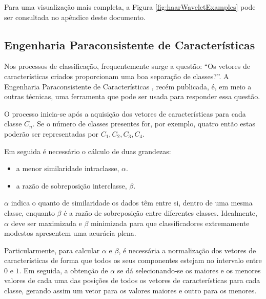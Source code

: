 			
			
			\par Para uma visualização mais completa, a Figura \ref{fig:haarWaveletExamples} pode ser consultada no apêndice deste documento.
			
			\subsection{Engenharia Paraconsistente de Características}
				\par Nos processos de classificação, frequentemente surge a questão: ``Os vetores de características criados proporcionam uma boa separação de classes?''. A Engenharia Paraconsistente de Características \cite{8588433}, recém publicada, é, em meio a outras técnicas, uma ferramenta que pode ser usada para responder essa questão.
				
				\par O processo inicia-se após a aquisição dos vetores de características para cada classe $C_n$. Se o número de classes presentes for, por exemplo, quatro então estas poderão ser representadas por $C_1, C_2, C_3, C_4$.
				\par Em seguida é necessário o cálculo de duas grandezas:
				
				\begin{itemize}
					\item a menor similaridade intraclasse, $\alpha$.
					\item a razão de sobreposição interclasse, $\beta$.
				\end{itemize}
			
				\par $\alpha$ indica o quanto de similaridade os dados têm entre si, dentro de uma mesma classe, enquanto $\beta$ é a razão de sobreposição entre diferentes classes. Idealmente, $\alpha$ deve ser maximizada e $\beta$ minimizada para que classificadores extremamente modestos apresentem uma acurácia plena.
				
				\par Particularmente, para calcular $\alpha$ e $\beta$, é necessária a normalização dos vetores de características de forma que todos os seus componentes estejam no intervalo entre $0$ e $1$. Em seguida, a obtenção de $\alpha$ se dá selecionando-se os maiores e os menores valores de cada uma das posições de todos os vetores de características para cada classe, gerando assim um vetor para os valores maiores e outro para os menores.
				
